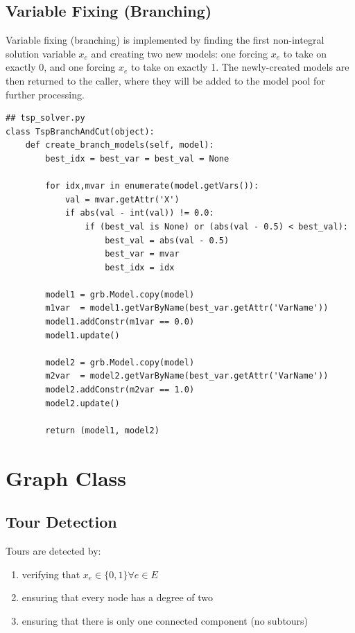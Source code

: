 \documentclass{article}
\begin{document}
\subsection{Variable Fixing (Branching)}
\begin{flushleft}

Variable fixing (branching) is implemented
by finding the first non-integral solution variable $x_e$
and creating two new models:
one forcing $x_e$ to take on exactly 0,
and one forcing $x_e$ to take on exactly 1.
The newly-created models
are then returned to the caller,
where they will be added to the model pool
for further processing.

\begin{lstlisting}
## tsp_solver.py
class TspBranchAndCut(object):
    def create_branch_models(self, model):
        best_idx = best_var = best_val = None

        for idx,mvar in enumerate(model.getVars()):
            val = mvar.getAttr('X')
            if abs(val - int(val)) != 0.0:
                if (best_val is None) or (abs(val - 0.5) < best_val):
                    best_val = abs(val - 0.5)
                    best_var = mvar
                    best_idx = idx

        model1 = grb.Model.copy(model)
        m1var  = model1.getVarByName(best_var.getAttr('VarName'))
        model1.addConstr(m1var == 0.0)
        model1.update()

        model2 = grb.Model.copy(model)
        m2var  = model2.getVarByName(best_var.getAttr('VarName'))
        model2.addConstr(m2var == 1.0)
        model2.update()

        return (model1, model2)
\end{lstlisting}

\end{flushleft}

\section{Graph Class}

\subsection{Tour Detection}

Tours are detected by:
\begin{enumerate}
  \item verifying that $x_e \in \{0,1\} \forall e \in E$
  \item ensuring that every node has a degree of two
  \item ensuring that there is only one connected component (no subtours)
\end{enumerate}
\end{document}
